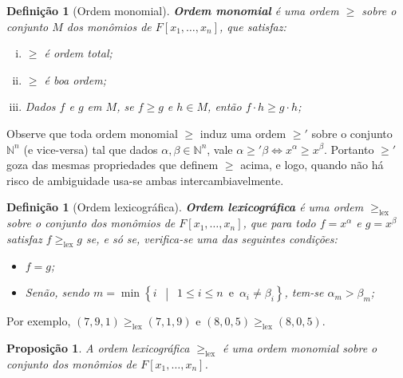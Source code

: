 \documentclass[12pt,a4paper]{report}
\newcommand{\N}{\mathbb{N}}
\newcommand{\suchthat}{\enspace\middle|\enspace}
\newtheorem{proposition}[theorem]{Proposição}
\newtheorem{definition}[theorem]{Definição}
\numberwithin{theorem}{chapter}
\begin{document}
\begin{definition}[Ordem monomial]\label{def_ordem_monomial}
  \textbf{Ordem monomial} é uma ordem \(\geq\) sobre o conjunto \(M\)
  dos monômios de \(F[x_1,\ldots,x_n]\), que satisfaz:
  \begin{enumerate}[(i)]
  \item \(\geq\) é ordem total;
  \item \(\geq\) é boa ordem;
  \item Dados \(f\) e \(g\) em \(M\), se \(f \geq g\) e \(h \in M\),
    então \(f \cdot h \geq g \cdot h\);
  \end{enumerate}
\end{definition}

Observe que toda ordem monomial \(\geq\) induz uma ordem \(\geq'\)
sobre o conjunto \(\N^n\) (e vice-versa) tal que dados \(\alpha, \beta
\in \N^n\), vale \(\alpha \geq' \beta \Longleftrightarrow x^\alpha
\geq x^\beta\).  Portanto \(\geq'\) goza das mesmas propriedades que
definem \(\geq\) acima, e logo, quando não há risco de ambiguidade
usa-se ambas intercambiavelmente.

\begin{definition}[Ordem lexicográfica]
  \textbf{Ordem lexicográfica} é uma ordem \(\geq_{\text{lex}}\) sobre
  o conjunto dos monômios de \(F[x_1,\ldots,x_n]\), que para todo \(f
  = x^\alpha\) e \(g = x^\beta\) satisfaz \(f \geq_{\text{lex}} g\)
  se, e só se, verifica-se uma das seguintes condições:

  \begin{itemize}
  \item \(f = g\);
  \item Senão, sendo \(m = \min\left\{i \suchthat 1 \leq i \leq n
      \enspace\text{e}\enspace \alpha_i \neq \beta_i\right\}\), tem-se
    \(\alpha_m > \beta_m\);
  \end{itemize}
\end{definition}

Por exemplo, \((7,9,1) \geq_{\text{lex}} (7,1,9)\) e \((8,0,5)
\geq_{\text{lex}} (8,0,5)\).

\begin{proposition}
  A ordem lexicográfica \(\geq_{\text{lex}}\) é uma ordem monomial
  sobre o conjunto dos monômios de \(F[x_1,\ldots,x_n]\).
\end{proposition}
\end{document}
